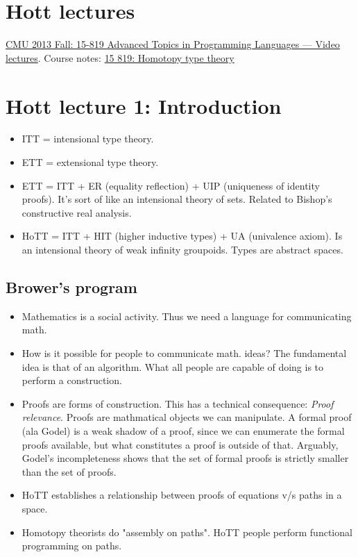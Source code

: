 \documentclass[11pt]{book}
\begin{document}
\chapter{Hott lectures}
\href{https://scs.hosted.panopto.com/Panopto/Pages/Viewer.aspx?id=0945cc7f-48b7-4803-81af-e7193a3f461d}{CMU 2013 Fall: 15-819 Advanced Topics in Programming Languages --- Video lectures}. Course notes: \href{http://www.cs.cmu.edu/~rwh/courses/hott/}{15 819: Homotopy type theory}

\chapter{Hott lecture 1: Introduction}

\begin{itemize}
\item ITT = intensional type theory.
\item ETT = extensional type theory.
\item ETT = ITT + ER (equality reflection) + UIP (uniqueness of identity proofs). It's sort of like an intensional theory of sets. Related to
        Bishop's constructive real analysis.
\item HoTT = ITT + HIT (higher inductive types) + UA (univalence axiom). Is an
    intensional theory of weak infinity groupoids. Types are abstract spaces.
\end{itemize}

\section{Brower's program}
\begin{itemize}
    \item Mathematics is a social activity. Thus we need a language for
        communicating math.
    \item How is it possible for people to communicate math. ideas? The
        fundamental idea is that of an algorithm.  What all people are capable
        of doing is to perform a construction.
    \item Proofs are forms of construction. This has a technical consequence:
        \emph{Proof relevance}. Proofs are mathmatical objects we can
        manipulate. A formal proof (ala Godel) is a weak shadow of a proof,
        since we can enumerate the formal proofs available, but what
        constitutes a proof is outside of that. Arguably, Godel's
        incompleteness shows that the set of formal proofs is strictly smaller
        than the set of proofs.
    \item HoTT establishes a relationship between proofs of equations v/s paths
        in a space.
    \item Homotopy theorists do "assembly on paths". HoTT people perform
        functional programming on paths.
\end{itemize}
\end{document}
